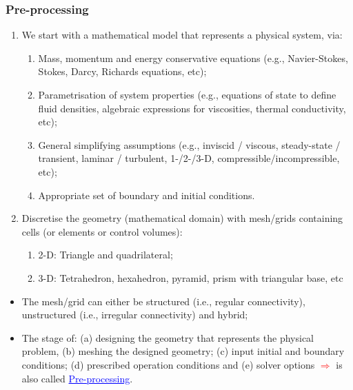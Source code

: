 \documentclass[10pt,compress]{beamer}
\begin{document}
\begin{frame}
 \frametitle{Pre-processing} 
\begin{enumerate}
  \item <1-> We start with a mathematical model that represents a physical system, via:
    \begin{enumerate}
      \item <2-> Mass, momentum and energy conservative equations (e.g., Navier-Stokes, Stokes, Darcy, Richards equations, etc);
      \item <3-> Parametrisation of system properties (e.g., equations of state to define fluid densities, algebraic expressions for viscosities, thermal conductivity, etc);
      \item <4-> General simplifying assumptions (e.g., inviscid / viscous, steady-state / transient, laminar / turbulent, 1-/2-/3-D, compressible/incompressible, etc); 
      \item <5-> Appropriate set of boundary and initial conditions.
    \end{enumerate}
  \item <6-> Discretise the geometry (mathematical domain) with mesh/grids containing cells (or elements or control volumes): 
    \begin{enumerate}
      \item <7-> 2-D: Triangle and quadrilateral;
      \item <8-> 3-D: Tetrahedron, hexahedron, pyramid, prism with triangular base, etc 
    \end{enumerate}
\end{enumerate} 
\begin{itemize}
   \item <9-> The mesh/grid can either be structured (i.e., regular connectivity), unstructured (i.e., irregular connectivity) and hybrid;
   \item <10-> The stage of: (a) designing the geometry that represents the physical problem, (b) meshing the designed geometry; (c) input initial and boundary conditions; (d) prescribed operation conditions and (e) solver options \textcolor{red}{$\Longrightarrow$} is also called \textcolor{blue}{\underline{Pre-processing}}.
\end{itemize}  
\end{frame}
 
\end{document}
